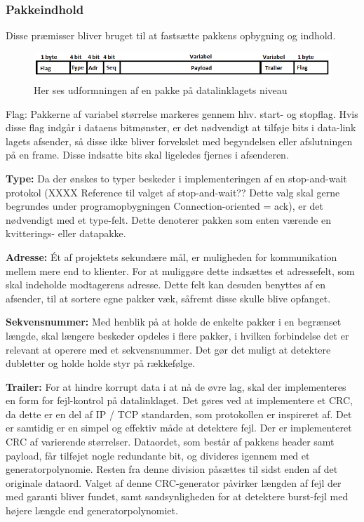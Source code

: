 \subsubsection{Pakkeindhold}
Disse præmisser bliver  bruget til at fastsætte pakkens opbygning og indhold.

\begin{figure}[h!]
\centering
\includegraphics[scale=0.8]{Billeder/DataLinkFrame.PNG}
\caption{Her ses udformningen af en pakke på datalinklagets niveau}
\label{fig:DataLinkFrame}
\end{figure}

Flag: Pakkerne af variabel størrelse markeres gennem hhv. start- og stopflag. Hvis disse flag indgår i dataens bitmønster, er det nødvendigt at tilføje bits i data-link lagets afsender, så disse ikke bliver forvekslet med begyndelsen eller afslutningen på en frame. Disse indsatte bits skal ligeledes fjernes i afsenderen. 

\textbf{Type:} Da der ønskes to typer beskeder i implementeringen af en stop-and-wait protokol (XXXX Reference til valget af stop-and-wait?? Dette valg skal gerne begrundes under programopbygningen Connection-oriented = ack), er det nødvendigt med et type-felt. Dette denoterer pakken som enten værende en kvitterings- eller datapakke.

\textbf{Adresse:} Ét af projektets sekundære mål, er muligheden for kommunikation mellem mere end to klienter. For at muliggøre dette indsættes et adressefelt, som skal indeholde modtagerens adresse. Dette felt kan desuden benyttes af en afsender, til at sortere egne pakker væk, såfremt disse skulle blive opfanget.

\textbf{Sekvensnummer:} Med henblik på at holde de enkelte pakker i en begrænset længde, skal længere beskeder opdeles i flere pakker, i hvilken forbindelse det er relevant at operere med et sekvensnummer. Det gør det muligt at detektere dubletter og holde holde styr på rækkefølge.

\textbf{Trailer:} For at hindre korrupt data i at nå de øvre lag, skal der implementeres en form for fejl-kontrol på datalinklaget. Det gøres ved at implementere et CRC, da dette er en del af IP / TCP standarden, som protokollen er inspireret af. Det er samtidig er en simpel og effektiv måde at detektere fejl.
Der er implementeret CRC af varierende størrelser. Dataordet, som består af pakkens header samt payload, får tilføjet nogle redundante bit, og divideres igennem med et generatorpolynomie. Resten fra denne division påsættes til sidst enden af det originale dataord.	Valget af denne CRC-generator påvirker længden af fejl der med garanti bliver fundet, samt sandsynligheden for at detektere burst-fejl med højere længde end generatorpolynomiet.

